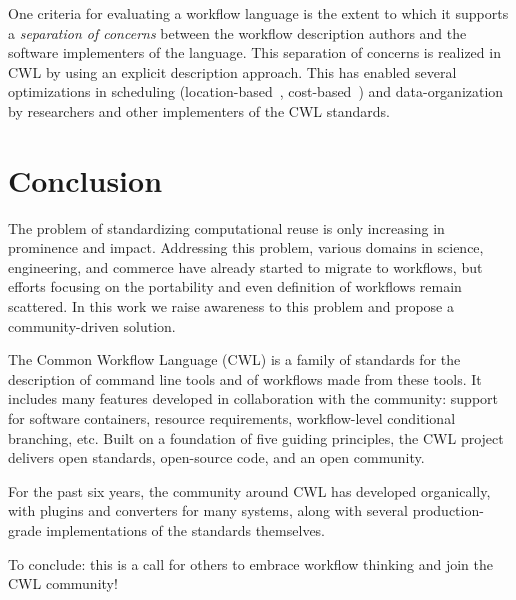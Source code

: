 \documentclass[sigconf,revew,screen,timestamp,nonacm]{acmart}
\begin{document}
One criteria for evaluating a workflow language is the extent to which it supports a \textit{separation of concerns} between the workflow description authors and the software implementers of the language. This separation of concerns is realized in CWL by using an explicit description approach. This has enabled several optimizations in scheduling (location-based~\cite{jiang_tr-19-01_2019}, cost-based~\cite{jiang_pivot_2019}) and data-organization by researchers and other implementers of the CWL standards.

\section{Conclusion}\label{sec:conclusion}

The problem of standardizing computational reuse is only increasing in prominence and impact. Addressing this problem, various domains in science, engineering, and commerce have already started to migrate to workflows, but efforts focusing on the portability and even definition of workflows remain scattered. In this work we raise awareness to this problem and propose a community-driven solution.

The Common Workflow Language (CWL) is a family of standards for the description of command line tools and of workflows made from these tools. It includes many features developed in collaboration with the community: support for software containers, resource requirements, workflow-level conditional branching, etc. Built on a foundation of five guiding principles, the CWL project delivers open standards, open-source code, and an open community.

For the past six years, the community around CWL has developed organically, with plugins and converters for many systems, along with several production-grade implementations of the standards themselves.

To conclude: this is a call for others to embrace workflow thinking and join the CWL community!
\end{document}
